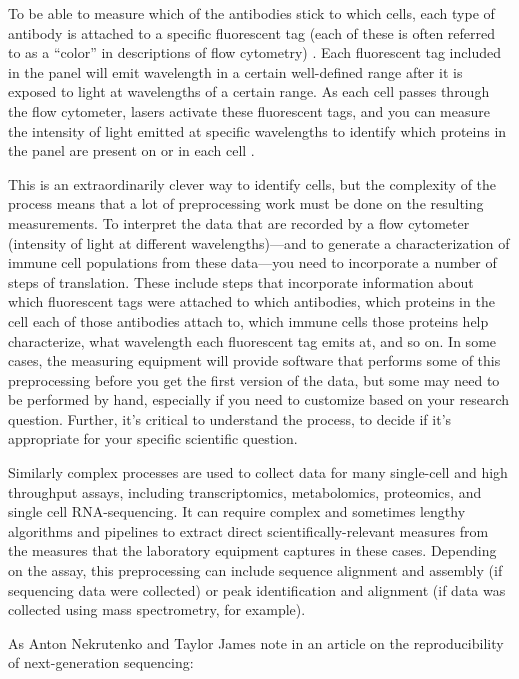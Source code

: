 \documentclass[]{tufte-book}
\begin{document}
To be able to measure which of the antibodies stick to which cells, each type of
antibody is attached to a specific fluorescent tag (each of these is often
referred to as a ``color'' in descriptions of flow cytometry) \citep{benoist2011flow}.
Each fluorescent tag included in the panel will emit wavelength in a certain
well-defined range after it is exposed to light at wavelengths of a certain
range. As each cell passes through the flow cytometer, lasers activate these
fluorescent tags, and you can measure the intensity of light emitted at specific
wavelengths to identify which proteins in the panel are present on or in each
cell \citep{barnett2008cd4}.

This is an extraordinarily clever way to identify cells, but the complexity of
the process means that a lot of preprocessing work must be done on the resulting
measurements. To interpret the data that are recorded by a flow cytometer
(intensity of light at different wavelengths)---and to generate a
characterization of immune cell populations from these data---you need to
incorporate a number of steps of translation. These include steps that
incorporate information about which fluorescent tags were attached to which
antibodies, which proteins in the cell each of those antibodies attach to, which
immune cells those proteins help characterize, what wavelength each fluorescent
tag emits at, and so on. In some cases, the measuring equipment will provide
software that performs some of this preprocessing before you get the first
version of the data, but some may need to be performed by hand, especially if
you need to customize based on your research question. Further, it's critical to
understand the process, to decide if it's appropriate for your specific
scientific question.

Similarly complex processes are used to collect data for many single-cell and
high throughput assays, including transcriptomics, metabolomics, proteomics,
and single cell RNA-sequencing. It can require complex and sometimes lengthy
algorithms and pipelines to extract direct scientifically-relevant measures
from the measures that the laboratory equipment captures in these cases.
Depending on the assay, this preprocessing can include sequence alignment
and assembly (if sequencing data were collected) or peak identification and
alignment (if data was collected using mass spectrometry, for example).

As Anton Nekrutenko and Taylor James note in an article on the reproducibility
of next-generation sequencing:
\end{document}
